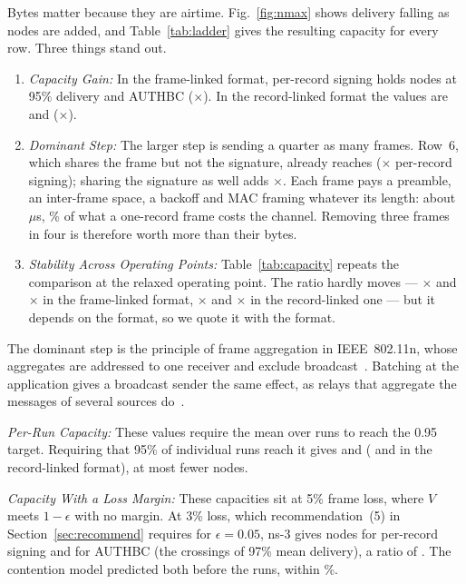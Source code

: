 \documentclass[lineno,pdflatex,sn-mathphys-num]{sn-jnl}
\newcommand{\us}{\,\ensuremath{\mu}s}
\newcommand{\runin}[1]{\textit{#1:}}
\renewcommand{\_}{\authbcunderscore\allowbreak}
\begin{document}
Bytes matter because they are airtime. Fig.~\ref{fig:nmax} shows delivery falling as nodes are
added, and Table~\ref{tab:ladder} gives the resulting capacity for every row. Three things stand
out.
\begin{enumerate}
\item \runin{Capacity Gain} In the frame-linked format, per-record signing holds \nmaxLeanBase{}
nodes at 95\% delivery and AUTHBC \nmaxLeanDesign{} (\ratioLean$\times$). In the record-linked
format the values are \nmaxFirstBase{} and \nmaxFirstDesign{} (\ratioFirst$\times$).
\item \runin{Dominant Step} The larger step is sending a quarter as many frames. Row~6, which
shares the frame but not the signature, already reaches \nmaxLeanInline{}
(\stepShareLean$\times$ per-record signing); sharing the signature as well adds
\stepSignLean$\times$. Each frame pays a preamble, an inter-frame space, a backoff and MAC framing
whatever its length: about \fixedCost\us, \fixedSharePct\% of what a one-record frame costs the
channel. Removing three frames in four is therefore worth more than their bytes.
\item \runin{Stability Across Operating Points} Table~\ref{tab:capacity} repeats the comparison at
the relaxed operating point. The ratio hardly moves --- \ratioLean$\times$ and
\ratioRelLean$\times$ in the frame-linked format, \ratioFirst$\times$ and \ratioRelFirst$\times$
in the record-linked one --- but it depends on the format, so we quote it with the format.
\end{enumerate}
The dominant step is the principle of frame aggregation in IEEE~802.11n, whose aggregates are
addressed to one receiver and exclude broadcast~\cite{skordoulis2008aggregation}. Batching at the
application gives a broadcast sender the same effect, as relays that aggregate the messages of
several sources do~\cite{rotta2024telemetrybroadcast}.

\runin{Per-Run Capacity} These values require the mean over runs to reach the 0.95 target.
Requiring that 95\% of individual runs reach it gives \nrunLeanBase{} and \nrunLeanDesign{}
(\nrunFirstBase{} and \nrunFirstDesign{} in the record-linked format), at most \nrunGap{} fewer
nodes.

\runin{Capacity With a Loss Margin} These capacities sit at 5\% frame loss, where $V$ meets
$1-\epsilon$ with no margin. At 3\% loss, which recommendation~(5) in
Section~\ref{sec:recommend} requires for $\epsilon = 0.05$, ns-3 gives \nmaxTightC{} nodes for
per-record signing and \nmaxTightD{} for AUTHBC (the crossings of 97\% mean delivery), a ratio of
\ratioTight. The contention model predicted both before the runs, within \tightPredWorst\%.
\end{document}
